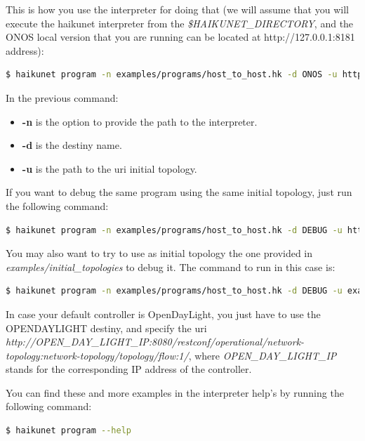 This is how you use the interpreter for doing that (we will assume that you will execute the haikunet interpreter from the \textit{\$HAIKUNET\_DIRECTORY}, and the ONOS local version that you are running can be located at http://127.0.0.1:8181 address):

\begin{lstlisting}[language=bash,breaklines=true]
$ haikunet program -n examples/programs/host_to_host.hk -d ONOS -u http://127.0.0.1:8181/onos/v1/
\end{lstlisting}

In the previous command:
\begin{itemize}
\item \textbf{-n} is the option to provide the path to the interpreter.
\item \textbf{-d} is the destiny name.
\item \textbf{-u} is the path to the uri initial topology.
\end{itemize}

If you want to debug the same program using the same initial topology, just run the following command:

\begin{lstlisting}[language=bash,breaklines=true]
$ haikunet program -n examples/programs/host_to_host.hk -d DEBUG -u http://127.0.0.1:8181/onos/v1/
\end{lstlisting}

You may also want to try to use as initial topology the one provided in \textit{examples/initial\_topologies} to debug it. The command to run in this case is:

\begin{lstlisting}[language=bash,breaklines=true]
$ haikunet program -n examples/programs/host_to_host.hk -d DEBUG -u examples/initial_topologies/example_topology.rb
\end{lstlisting}

In case your default controller is OpenDayLight, you just have to use the OPENDAYLIGHT destiny, and specify the uri \textit{http://OPEN\_DAY\_LIGHT\_IP:8080/restconf/operational/network-topology:network-topology/topology/flow:1/}, where \textit{OPEN\_DAY\_LIGHT\_IP} stands for the corresponding IP address of the controller. 

You can find these and more examples in the interpreter help's by running the following command:

\begin{lstlisting}[language=bash,breaklines=true]
$ haikunet program --help
\end{lstlisting}


